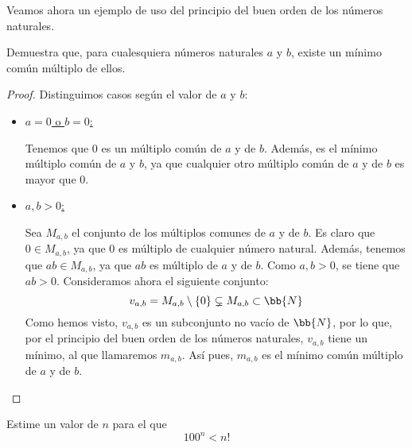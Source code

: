 Veamos ahora un ejemplo de uso del principio del buen orden de los números naturales.
\begin{ejercicio}
    Demuestra que, para cualesquiera números naturales $a$ y $b$, existe un mínimo
    común múltiplo de ellos.
    \begin{proof}
        Distinguimos casos según el valor de $a$ y $b$:
        \begin{itemize}
            \item \ul{$a = 0$ o $b = 0$:}
            
            Tenemos que $0$ es un múltiplo común de $a$ y de $b$. Además, es el mínimo múltiplo común de $a$ y $b$, ya que cualquier otro múltiplo común de $a$ y de $b$ es mayor que $0$.

            \item \ul{$a,b > 0$:}
            
            Sea $M_{a,b}$ el conjunto de los múltiplos comunes de $a$ y de $b$.
            Es claro que $0\in M_{a,b}$, ya que $0$ es múltiplo de cualquier número natural. Además, tenemos que
            $ab\in M_{a,b}$, ya que $ab$ es múltiplo de $a$ y de $b$. Como $a,b>0$, se tiene que $ab>0$.
            Consideramos ahora el siguiente conjunto:
            \begin{equation*}
                v_{a,b} = M_{a,b}\setminus \{0\} \subsetneq M_{a,b} \subset \bb{N}
            \end{equation*}
            Como hemos visto, $v_{a,b}$ es un subconjunto no vacío de $\bb{N}$, por lo que, por el principio del buen orden de los números naturales, $v_{a,b}$ tiene un mínimo, al que llamaremos $m_{a,b}$.
            Así pues, $m_{a,b}$ es el mínimo común múltiplo de $a$ y de $b$.
        \end{itemize}
    \end{proof}
\end{ejercicio}


\begin{ejercicio}
    Estime un valor de $n$ para el que
    $$100^n < n!$$
\end{ejercicio}

